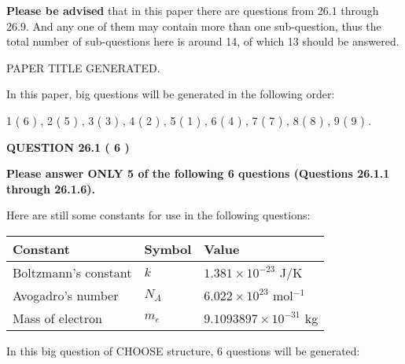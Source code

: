 \documentclass[12pt]{article}
\begin{document}
 
{\textbf{\large{Please be advised}}} that in this paper there are questions from
26.1 through
26.9.
And any one of them may contain more than one sub-question, thus the total number
of sub-questions here is around 14, of which
13 should be answered.
 
\vspace{0.3in}
 
 
   
   
 PAPER TITLE GENERATED.
   
   
   
\vspace{0.2in}
   
In this paper, big questions will be generated in the following order: 
   
   
             1 (           6 )
 ,
             2 (           5 )
 ,
             3 (           3 )
 ,
             4 (           2 )
 ,
             5 (           1 )
 ,
             6 (           4 )
 ,
             7 (           7 )
 ,
             8 (           8 )
 ,
             9 (           9 )
 .
  
\vspace{0.2in}
  
{\textbf{\Large{QUESTION
26.1 
 (           6 )
}}}
  
  
 
{\textbf{\Large{Please answer ONLY
5 of the following
6 questions (Questions
26.1.1 through
26.1.6). }}}
 
Here are still some constants for use in the following questions:
 
 
\noindent\begin{tabular}{|l|l|l|}
\hline
Constant & Symbol & Value \\
\hline
 
Boltzmann's constant &
$k$ &
 $ 1.381 \times 10^{-23} $
J/K \\
\hline
 
Avogadro's number &
$N_A$ &
 $ 6.022 \times 10^{23} $
mol$^{-1}$ \\
\hline
 
Mass of electron &
$m_e$ &
 $ 9.1093897 \times 10^{-31} $
kg \\
\hline
 
\end{tabular}
 
   
\vspace{0.2in}
   
 In this big question of CHOOSE structure,            6  questions will be generated: 
  
\end{document}
